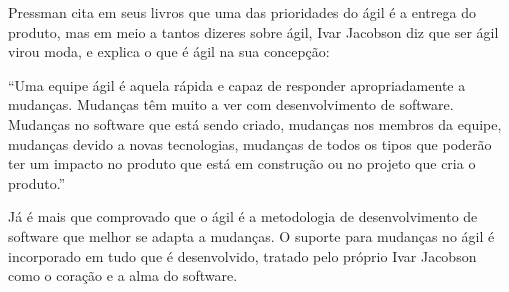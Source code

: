 Pressman cita em seus livros que uma das prioridades do ágil é a entrega do produto, mas em meio a tantos dizeres sobre ágil, Ivar Jacobson diz que ser ágil virou moda, e explica o que é ágil na sua concepção:

“Uma equipe ágil é aquela rápida e capaz de responder apropriadamente a mudanças. Mudanças têm muito a ver com desenvolvimento de software. Mudanças no software que está sendo criado, mudanças nos membros da equipe, mudanças devido a novas tecnologias, mudanças de todos os tipos que poderão ter um impacto no produto que está em construção ou no projeto que cria o produto.”

Já é mais que comprovado que o ágil é a metodologia de desenvolvimento de software que melhor se adapta a mudanças. O suporte para mudanças no ágil é incorporado em tudo que é desenvolvido, tratado pelo próprio Ivar Jacobson como o coração e a alma do software.
